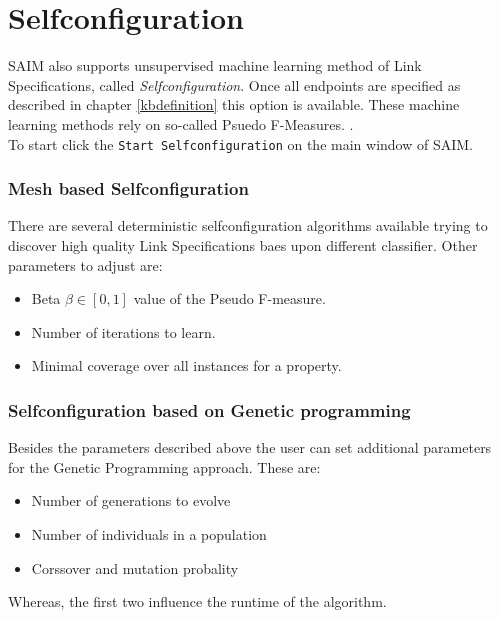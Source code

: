 \documentclass[oneside,a4paper,12pt]{memoir}
\begin{document}
\chapter{Selfconfiguration}
\label{selfconfig}
SAIM also supports unsupervised machine learning method of Link Specifications, called \emph{Selfconfiguration}. Once all endpoints are specified as described in chapter \ref{kbdefinition} this option is available. These machine learning methods rely on so-called Psuedo F-Measures. .\\
To start click the \texttt{Start Selfconfiguration} on the main window of SAIM.
\subsection{Mesh based Selfconfiguration}
There are several deterministic selfconfiguration algorithms available trying to discover high quality Link Specifications baes upon different classifier. Other parameters to adjust are:

\begin{itemize}
	\item Beta $\beta \in [0,1]$ value of the Pseudo F-measure.
	\item Number of iterations to learn.
	\item Minimal coverage over all instances for a property.
\end{itemize}

\subsection{Selfconfiguration based on Genetic programming}
Besides the parameters described above the user can set additional parameters for the Genetic Programming approach. These are:
\begin{itemize}
	\item Number of generations to evolve
	\item Number of individuals in a population
	\item Corssover and mutation probality
\end{itemize}
Whereas, the first two influence the runtime of the algorithm.

\end{document}
